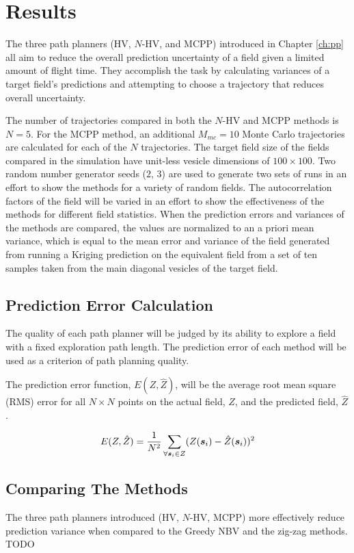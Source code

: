 \chapter{Results}
The three path planners (HV, $N$-HV, and MCPP) introduced in Chapter \ref{ch:pp} all aim to reduce the overall prediction uncertainty of a field given a limited amount of flight time. They accomplish the task by calculating variances of a target field's predictions and attempting to choose a trajectory that reduces overall uncertainty. 

The number of trajectories compared in both the $N$-HV and MCPP methods is $N=5$. For the MCPP method, an additional $M_{mc}=10$ Monte Carlo trajectories are calculated for each of the $N$ trajectories. The target field size of the fields compared in the simulation have unit-less vesicle dimensions of $100\times 100$. Two random number generator seeds ($2$, $3$) are used to generate two sets of runs in an effort to show the methods for a variety of random fields. The autocorrelation factors of the field will be varied in an effort to show the effectiveness of the methods for different field statistics. When the prediction errors and variances of the methods are compared, the values are normalized to an a priori mean variance, which is equal to the mean error and variance of the field generated from running a Kriging prediction on the equivalent field from a set of ten samples taken from the main diagonal vesicles of the target field.

\section{Prediction Error Calculation}
The quality of each path planner will be judged by its ability to explore a field with a fixed exploration path length. The prediction error of each method will be used as a criterion of path planning quality.

The prediction error function, $E (Z,\hat{Z})$, will be the average root mean square (RMS) error for all $N\times N$ points on the actual field, $Z$, and the predicted field, $\hat{Z}$.

\begin{equation}
E (Z, \hat{Z}) = \frac{1}{N^2}\sum_{\forall {\it{\boldsymbol{s}}}_i \in Z} (Z({\it{\boldsymbol{s}}}_i) - \hat{Z}({\it{\boldsymbol{s}}}_i))^2
\end{equation}



\section{Comparing The Methods}
The three path planners introduced (HV, $N$-HV, MCPP) more effectively reduce prediction variance when compared to the Greedy NBV and the zig-zag methods. TODO